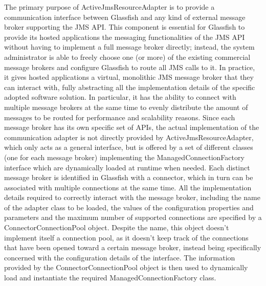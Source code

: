 The primary purpose of ActiveJmsResourceAdapter is to provide a communication interface between Glassfish and any kind of external message broker supporting the JMS API.  
This component is essential for Glassfish to provide  its hosted applications the messaging functionalities of the JMS API without having to implement a full message broker directly; instead, the system administrator is able to freely choose one (or more) of the existing commercial message brokers and configure Glassfish to route all JMS calls to it. In practice, it gives hosted applications a virtual, monolithic JMS message broker that they can interact with, fully abstracting all the implementation details of the specific adopted software solution.
In particular, it has the ability to connect with multiple message brokers at the same time to evenly distribute the amount of messages to be routed for performance and scalability reasons. Since each message broker has its own specific set of APIs, the actual implementation of the communication adapter is not directly provided by ActiveJmsResourceAdapter, which only acts as a general interface, but is offered by a set of different classes (one for each message broker) implementing the ManagedConnectionFactory interface which are dynamically loaded at runtime when needed. 
Each distinct message broker is identified in Glassfish with a connector, which in turn can be associated with multiple connections at the same time. All the implementation details required to correctly interact with the message broker, including the name of the adapter class to be loaded, the values of the configuration properties and parameters and the maximum number of supported connections are specified by a ConnectorConnectionPool object. Despite the name, this object doesn't implement itself a connection pool, as it doesn't keep track of the connections that have been opened toward a certain message broker, instead being specifically concerned with the configuration details of the interface. The information provided by the ConnectorConnectionPool object is then used to dynamically load and instantiate the required ManagedConnectionFactory class.


